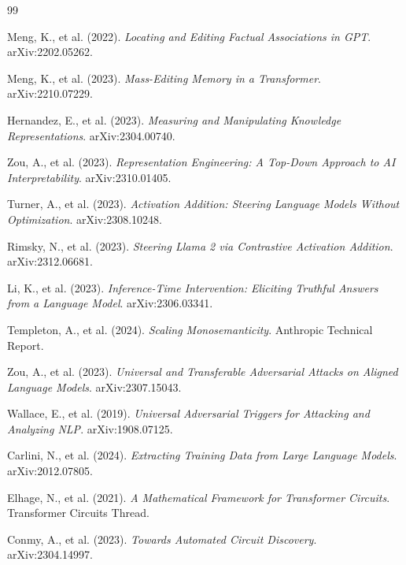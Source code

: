 \documentclass[10pt]{article}
\begin{document}
\clearpage
\begin{thebibliography}{99}

Meng, K., et al. (2022). \textit{Locating and Editing Factual Associations in GPT}. arXiv:2202.05262.
    
Meng, K., et al. (2023). \textit{Mass-Editing Memory in a Transformer}. arXiv:2210.07229.
    
Hernandez, E., et al. (2023). \textit{Measuring and Manipulating Knowledge Representations}. arXiv:2304.00740.
    
Zou, A., et al. (2023). \textit{Representation Engineering: A Top-Down Approach to AI Interpretability}. arXiv:2310.01405.
    
Turner, A., et al. (2023). \textit{Activation Addition: Steering Language Models Without Optimization}. arXiv:2308.10248.
    
Rimsky, N., et al. (2023). \textit{Steering Llama 2 via Contrastive Activation Addition}. arXiv:2312.06681.
    
Li, K., et al. (2023). \textit{Inference-Time Intervention: Eliciting Truthful Answers from a Language Model}. arXiv:2306.03341.

Templeton, A., et al. (2024). \textit{Scaling Monosemanticity}. Anthropic Technical Report.

Zou, A., et al. (2023). \textit{Universal and Transferable Adversarial Attacks on Aligned Language Models}. arXiv:2307.15043.

Wallace, E., et al. (2019). \textit{Universal Adversarial Triggers for Attacking and Analyzing NLP}. arXiv:1908.07125.

Carlini, N., et al. (2024). \textit{Extracting Training Data from Large Language Models}. arXiv:2012.07805.

Elhage, N., et al. (2021). \textit{A Mathematical Framework for Transformer Circuits}. Transformer Circuits Thread.

Conmy, A., et al. (2023). \textit{Towards Automated Circuit Discovery}. arXiv:2304.14997.


\end{thebibliography}
\end{document}
